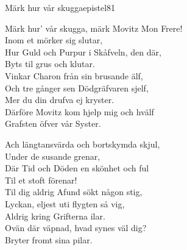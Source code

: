 \newpage


\begin{song}{Märk hur vår skugga}{epistel81}
\begin{vers}           
Märk hur' vår skugga, märk Movitz Mon Frere!\\
Inom et mörker sig slutar,\\
Hur Guld och Purpur i Skåfveln, den där,\\
Byts til grus och klutar.\\
Vinkar Charon från sin brusande älf,\\
Och tre gånger sen Dödgräfvaren sjelf,\\
Mer du din drufva ej kryster.\\
Därföre Movitz kom hjelp mig och hvälf\\
Grafsten öfver vår Syster.\\
\end{vers}
\begin{vers}          
Ach längtansvärda och bortskymda skjul,\\
Under de susande grenar,\\
Där Tid och Döden en skönhet och ful\\
Til et stoft förenar!\\
Til dig aldrig Afund sökt någon stig,\\
Lyckan, eljest uti flygten så vig,\\
Aldrig kring Grifterna ilar.\\
Ovän där väpnad, hvad synes väl dig?\\
Bryter fromt sina pilar.\\
\end{vers}

\newp


\end{song}

